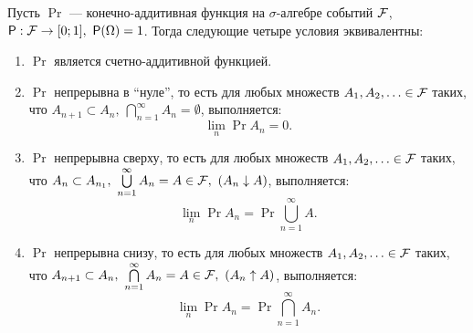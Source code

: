 \begin{theorem}
    Пусть $ \Pr $ --- конечно-аддитивная функция на $ \sigma $-алгебре событий $ \mathcal{F} $, \(\Pr: \F \to [0; 1],\ \Pr(\Omega) = 1 \). Тогда следующие четыре условия эквивалентны:
        \begin{enumerate}[label = (\alph*)]
            \item $ \Pr $ является счетно-аддитивной функцией.
            
            \item $ \Pr $ непрерывна в ``нуле'', то есть для любых множеств \(A_1, A_2, \ldots \in \mathcal{F} \) таких, что \(A_{n + 1} \subset A_n,\ \bigcap\limits_{n = 1}^{\infty}A_n = \emptyset \), выполняется:
            \[
                \lim\limits_{n}\Pr{A_n} = 0.
            \]  
            
            \item $ \Pr $ непрерывна сверху, то есть для любых множеств \(A_1, A_2, \ldots \in \mathcal{F} \) таких, что \(A_{n} \subset A_{n_1},\ \bigcup\limits_{n = 1}^{\infty}A_n = A \in \mathcal{F},\  (A_n \downarrow A) \), выполняется:
            \[
            \lim\limits_{n}\Pr{A_n} = \Pr{\bigcup\limits_{n = 1}^{\infty}A}.
            \]  
            
            \item $ \Pr $ непрерывна снизу, то есть для любых множеств \(A_1, A_2, \ldots \in \mathcal{F} \) таких, что \(A_{n + 1} \subset A_{n},\ \bigcap\limits_{n = 1}^{\infty}A_n = A \in \mathcal{F},\  (A_n \uparrow A) \), выполняется:
            \[
            \lim\limits_{n}\Pr{A_n} = \Pr{\bigcap\limits_{n = 1}^{\infty}A_n}.
            \]  
            
        \end{enumerate}
\end{theorem}
